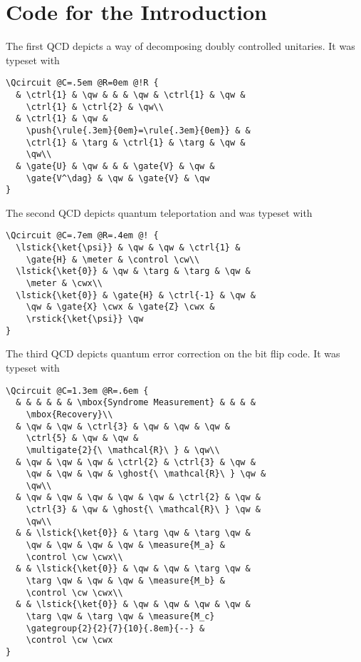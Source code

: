 \documentclass[twocolumn,nofootinbib]{revtex4}
\begin{document}
\section{Code for the Introduction\label{S:code}}
The first QCD depicts a way of decomposing doubly controlled unitaries.
It was typeset with
{\small \begin{verbatim}\Qcircuit @C=.5em @R=0em @!R {
  & \ctrl{1} & \qw & & & \qw & \ctrl{1} & \qw &
    \ctrl{1} & \ctrl{2} & \qw\\
  & \ctrl{1} & \qw & 
    \push{\rule{.3em}{0em}=\rule{.3em}{0em}} & &
    \ctrl{1} & \targ & \ctrl{1} & \targ & \qw &
    \qw\\
  & \gate{U} & \qw & & & \gate{V} & \qw &
    \gate{V^\dag} & \qw & \gate{V} & \qw
}
\end{verbatim}}

The second QCD depicts quantum teleportation and was typeset with
{\small \begin{verbatim}\Qcircuit @C=.7em @R=.4em @! {
  \lstick{\ket{\psi}} & \qw & \qw & \ctrl{1} &
    \gate{H} & \meter & \control \cw\\
  \lstick{\ket{0}} & \qw & \targ & \targ & \qw &
    \meter & \cwx\\
  \lstick{\ket{0}} & \gate{H} & \ctrl{-1} & \qw &
    \qw & \gate{X} \cwx & \gate{Z} \cwx &
    \rstick{\ket{\psi}} \qw
}
\end{verbatim}}

The third QCD depicts quantum error correction on the bit flip code.  It was typeset with
{\small \begin{verbatim}\Qcircuit @C=1.3em @R=.6em {
  & & & & & & \mbox{Syndrome Measurement} & & & &
    \mbox{Recovery}\\
  & \qw & \qw & \ctrl{3} & \qw & \qw & \qw &
    \ctrl{5} & \qw & \qw &
    \multigate{2}{\ \mathcal{R}\ } & \qw\\
  & \qw & \qw & \qw & \ctrl{2} & \ctrl{3} & \qw &
    \qw & \qw & \qw & \ghost{\ \mathcal{R}\ } \qw &
    \qw\\
  & \qw & \qw & \qw & \qw & \qw & \ctrl{2} & \qw &
    \ctrl{3} & \qw & \ghost{\ \mathcal{R}\ } \qw &
    \qw\\
  & & \lstick{\ket{0}} & \targ \qw & \targ \qw &
    \qw & \qw & \qw & \qw & \measure{M_a} &
    \control \cw \cwx\\
  & & \lstick{\ket{0}} & \qw & \qw & \targ \qw &
    \targ \qw & \qw & \qw & \measure{M_b} &
    \control \cw \cwx\\
  & & \lstick{\ket{0}} & \qw & \qw & \qw & \qw &
    \targ \qw & \targ \qw & \measure{M_c}
    \gategroup{2}{2}{7}{10}{.8em}{--} &
    \control \cw \cwx
}
\end{verbatim}}
\end{document}

